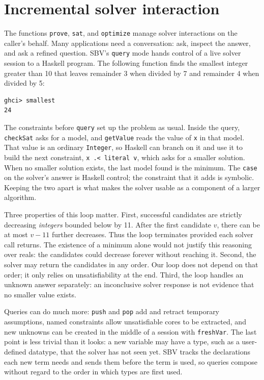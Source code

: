 \documentclass[review]{jfp-epi}
\newcommand{\code}[1]{\texttt{#1}}
\begin{document}
\section{Incremental solver interaction}
\label{sec:queries}

The functions \code{prove}, \code{sat}, and \code{optimize} manage solver
interactions on the caller's behalf. Many applications need a conversation: ask, inspect the
answer, and ask a refined question. SBV's \code{query} mode hands control of a
live solver session to a Haskell program. The following function finds the
smallest integer greater than 10 that leaves remainder 3 when divided by 7 and
remainder 4 when divided by 5:
\begin{lstlisting}[style=output]
ghci> smallest
24
\end{lstlisting}
The constraints before \code{query} set up the problem as usual. Inside the
query, \code{checkSat} asks for a model, and \code{getValue} reads the value of
\code{x} in that model. That value is an ordinary \code{Integer}, so Haskell can
branch on it and use it to build the next constraint, \code{x .< literal v},
which asks for a smaller solution. When no smaller solution exists, the last
model found is the minimum. The \code{case} on the solver's answer is Haskell
control; the constraint that it adds is symbolic. Keeping the two apart is what
makes the solver usable as a component of a larger algorithm.

Three properties of this loop matter. First, successful candidates are strictly
decreasing \emph{integers} bounded below by 11. After the first candidate $v$,
there can be at most $v-11$ further decreases. Thus the loop terminates provided
each solver call returns. The existence of a minimum alone would not justify
this reasoning over reals: the candidates could decrease forever without
reaching it. Second, the solver may return the candidates in any order. Our loop
does not depend on that order; it only relies on unsatisfiability at the end.
Third, the loop handles an unknown answer separately: an inconclusive solver
response is not evidence that no smaller value exists.

Queries can do much more: \code{push} and \code{pop} add and retract temporary
assumptions, named constraints allow unsatisfiable cores to be extracted, and new
unknowns can be created in the middle of a session with \code{freshVar}. The last
point is less trivial than it looks: a new variable may have a type, such as a
user-defined datatype, that the solver has not seen yet. SBV tracks the
declarations each new term needs and sends them before the term is used, so
queries compose without regard to the order in which types are first used.
\end{document}
